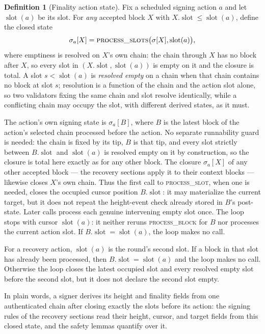 \ifx\litemode\undefined\documentclass{article}\fi
\theoremstyle{plain}
\theoremstyle{definition}
\newtheorem{definition}{Definition}
\theoremstyle{remark}
\newcommand{\slot}{\operatorname{\mathrm{slot}}}
\begin{document}
\begin{definition}[Finality action state]\label{def:finality-action-state}
Fix a scheduled signing action \(a\) and let \(\slot(a)\) be its slot.
For \emph{any} accepted block \(X\) with \(X.\slot\leq\slot(a)\),
define the closed state
\[
  \sigma_a[X]
  =
  \textsc{process\_slots}\bigl(\sigma[X],\slot(a)\bigr),
\]
where emptiness is resolved on \(X\)'s own chain: the chain through
\(X\) has no block after \(X\), so every slot in
\((X.\slot,\slot(a))\) is empty on it and the closure is total.  A slot
\(s<\slot(a)\) is \emph{resolved empty} on a chain when that chain
contains no block at slot \(s\); resolution is a function of the chain
and the action slot alone, so two validators fixing the same chain and
slot resolve identically, while a conflicting chain may occupy the slot,
with different derived states, as it must.

The action's own signing state is \(\sigma_a[B]\), where \(B\)
is the latest block of the action's selected chain processed before the
action.  No separate runnability guard is needed: the chain is fixed by
its tip, \(B\) is that tip, and every slot strictly between
\(B.\slot\) and \(\slot(a)\) is resolved empty on it by construction,
so the closure is total here exactly as for any other block.  The
closure \(\sigma_a[X]\) of any
other accepted block --- the recovery sections apply it to their
context blocks --- likewise closes \(X\)'s own chain.
Thus the first call to \textsc{process\_slot}, when one is needed, closes the
occupied cursor position \(B.\slot\): it may materialize the current target,
but it does not repeat the height-event check already stored in \(B\)'s
post-state.  Later calls process each genuine intervening empty slot once.
The loop stops with cursor \(\slot(a)\): it neither reruns
\textsc{process\_block} for \(B\) nor processes the current action slot.  If
\(B.\slot=\slot(a)\), the loop makes no call.

For a recovery action, \(\slot(a)\) is the round's second slot.  If a block in
that slot has already been processed, then \(B.\slot=\slot(a)\) and the loop
makes no call.  Otherwise the loop closes the latest occupied slot and every
resolved empty slot before the second slot, but it does not declare the second
slot empty.

In plain words, a signer derives its height and finality fields from one
authenticated chain after closing exactly the slots before its action:
the signing rules of the recovery sections read their height, cursor, and
target fields from this closed state, and the safety lemmas quantify over
it.
\end{definition}
\end{document}
